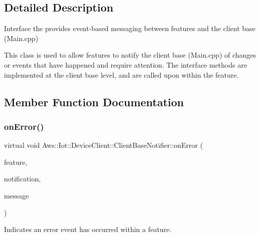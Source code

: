 \subsection{Detailed Description}
Interface the provides event-\/based messaging between features and the client base (Main.\+cpp) 

This class is used to allow features to notify the client base (Main.\+cpp) of changes or events that have happened and require attention. The interface methods are implemented at the client base level, and are called upon within the feature. 

\subsection{Member Function Documentation}
\mbox{\label{class_aws_1_1_iot_1_1_device_client_1_1_client_base_notifier_a4b1f9d16f18965cccb96de1518a53abe}} 
\subsubsection{\texorpdfstring{on\+Error()}{onError()}}
{\footnotesize\ttfamily virtual void Aws\+::\+Iot\+::\+Device\+Client\+::\+Client\+Base\+Notifier\+::on\+Error (\begin{DoxyParamCaption}\item[{\hyperlink{class_aws_1_1_iot_1_1_device_client_1_1_feature}{Aws\+::\+Iot\+::\+Device\+Client\+::\+Feature} $\ast$}]{feature,  }\item[{Aws\+::\+Iot\+::\+Device\+Client\+::\+Client\+Base\+Error\+Notification}]{notification,  }\item[{std\+::string}]{message }\end{DoxyParamCaption})\hspace{0.3cm}{\ttfamily [pure virtual]}}



Indicates an error event has occurred within a feature. 


